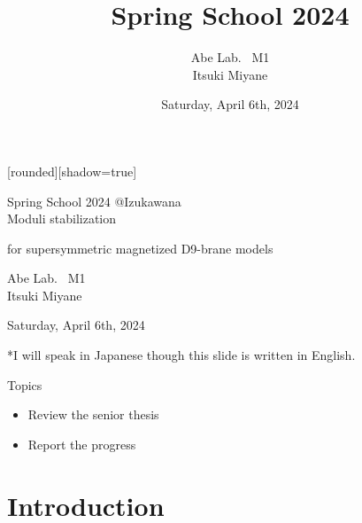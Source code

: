 \documentclass[
  unicode,a4paper,11pt,aspectratio=169,
  xcolor = {dvipsnames,svgnames},
  hyperref ={colorlinks=true,citecolor=Navy,linkcolor=NavyBlue,urlcolor=purple},
  ja=standard,lualatex
]{beamer}
\title{
  Spring School 2024
}
\author{
  Abe Lab. \ M1
  \texorpdfstring{\\}{}
  \texorpdfstring{\vspace*{3pt}}{}
  Itsuki Miyane
}
\date{Saturday, April 6th, 2024}
\begin{document}
\begin{frame}

  [rounded][shadow=true]

  \begin{block}{}
    \centering
    Spring School 2024 @Izukawana
    \\
    \Large
    Moduli stabilization

    for supersymmetric magnetized D9-brane models
  \end{block}

  \begin{center}
    Abe Lab. \ M1 \\
    Itsuki Miyane

    \vspace*{5pt}

    Saturday, April 6th, 2024
  \end{center}

  \begin{center}
    *I will speak in Japanese though this slide is written in English.
  \end{center}
\end{frame}

\begin{frame}{Topics}
  \begin{itemize}
    \item
          Review the senior thesis
    \item
          Report the progress
  \end{itemize}
\end{frame}


\section{Introduction}

\begin{frame}
  \huge \secname
\end{frame}
\end{document}

